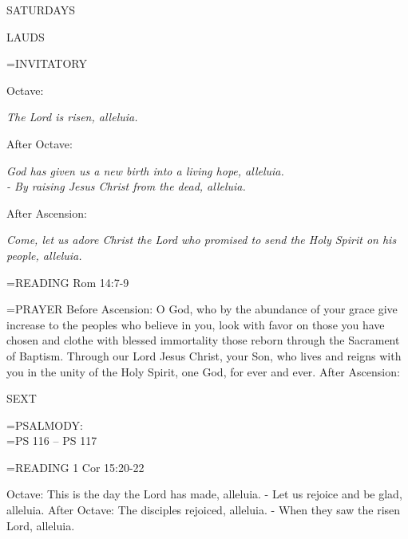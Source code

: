\begin{center}\normalsize SATURDAYS\\
\end{center}

\begin{flushleft}\normalsize LAUDS\\\end{flushleft}

\hangindent=\parindent \small{INVITATORY}
\begin{center}
\end{center}Octave:\begin{center}\textit{	The Lord is risen, alleluia.\\}
\end{center}After Octave:\begin{center}\textit{	God has given us a new birth into a living hope, alleluia.\\}
\textit{- By raising Jesus Christ from the dead, alleluia.\\}
\end{center}After Ascension:\begin{center}\textit{	Come, let us adore Christ the Lord who promised to send the Holy Spirit on his people, alleluia.\\}
\end{center}

\hangindent=\parindent \small{\uppercase{READING}}    Rom 14:7-9 \textbf{   \\}

\hangindent=\parindent \small{PRAYER }
Before Ascension:	O God, who by the abundance of your grace give increase to the peoples who believe in you, look with favor on those you have chosen and clothe with blessed immortality those reborn through the Sacrament of Baptism. Through our Lord Jesus Christ, your Son, who lives and reigns with you in the unity of the Holy Spirit, one God, for ever and ever.
After Ascension:	

\begin{flushleft}\normalsize SEXT\\\end{flushleft}

\hangindent=\parindent \small{PSALMODY:}\\
\hangindent=\parindent  PS 116 -- PS 117\vspace{0.5em}

\hangindent=\parindent \small{\uppercase{READING}}    1 Cor 15:20-22 \textbf{   \\}

Octave:	This is the day the Lord has made, alleluia.
- Let us rejoice and be glad, alleluia.
After Octave:	The disciples rejoiced, alleluia.
- When they saw the risen Lord, alleluia.
